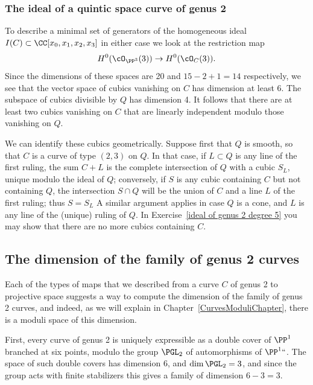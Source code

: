 \subsubsection*{The ideal of a quintic space curve of genus 2}
\label{genus 2 quintic}

To describe a minimal set of generators of the homogeneous ideal
$I(C) \subset \CC[x_0, x_1, x_2, x_3]$ in either case
we look at the
restriction map
$$
H^0(\cO_{\PP^3}(3)) \to H^0(\cO_C(3)).
$$
Since the dimensions of these spaces are 20 and $15-2+1 = 14$
respectively, we see that the vector space of cubics vanishing on $C$
has dimension at least 6.
The subspace of cubics divisible by $Q$ has dimension 4. It follows
that there are at least two cubics vanishing on $C$ that are linearly
independent modulo those vanishing on $Q$.

We can identify these cubics geometrically. Suppose first that $Q$
is smooth, so that $C$ is a curve of type $(2,3)$ on $Q$. In that
case, if $L \subset Q$ is any line of the first ruling, the sum $C+L$
is the complete intersection of $Q$ with a cubic $S_L$, unique modulo
the ideal of $Q$; conversely, if $S$ is any cubic containing $C$ but
not containing $Q$, the intersection $S \cap Q$ will be the union of
$C$ and a line $L$ of the first ruling; thus $S = S_L$
A
similar argument applies in case $Q$ is a cone, and $L$ is any line of
the (unique) ruling of $Q$. In Exercise~\ref{ideal of genus 2 degree 5}
you may show that there are no more cubics containing $C$.

\subsection*{The dimension of the family of genus 2 curves}

Each of the types of maps that we described from a curve $C$ of genus
%
2 to projective space suggests
a way to compute the dimension of the family of genus 2 curves, and
indeed, as we will explain in Chapter~\ref{CurvesModuliChapter}, there
is a moduli space of this dimension.

First,  every curve of genus 2 is uniquely expressible as a double
cover of $\PP^1$ branched at six points, modulo the group $\PGL_2$ of
automorphisms of $\PP^1` `$. The space of such double covers has dimension 6,
%
and $\dim\PGL_2 = 3$, and since the group acts with finite stabilizers
this gives a family of dimension $6-3 = 3$.


